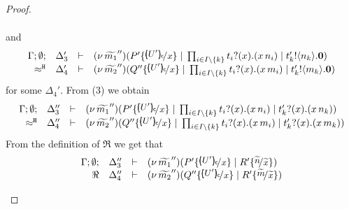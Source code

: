 \begin{proof}
\begin{enumerate}
\begin{enumerate}[i.]
\begin{eqnarray*}
							\end{eqnarray*}
							and
							\begin{eqnarray}
							\mhorel{\Gamma}{\Delta_3'}{  \newsp{\widetilde{m_1}''}{P' \subst{\omapchar{U'}}{x} \Par \prod_{i \in I\backslash{\set{k}}} \binp{t_i}{x} (\appl{x}{n_i}) \Par
									\bout{t'_k}{n_k} \inact}}
							{ \hwb }
							{\Delta_4'}{}{\newsp{\widetilde{m_2}''}{Q'' \subst{\omapchar{U'}}{x} \Par \prod_{i \in I\backslash{\set{k}}} \binp{t_i}{x} (\appl{x}{m_i}) \Par \bout{t'_k}{m_k} \inact}}
							\label{lem:tr_subst_41}
							\end{eqnarray}
							for some $\Delta_4'$.
							From  (3) we obtain
							\begin{eqnarray}
								\mhorel{\Gamma}{\Delta_3''}{  \newsp{\widetilde{m_1}''}{P' \subst{\omapchar{U'}}{x} \Par \prod_{i \in I\backslash{\set{k}}} \binp{t_i}{x} (\appl{x}{n_i}) \Par
								\binp{t'_k}{x} (\appl{x}{n_k})}}
								{ \hwb }
								{\Delta_4''}{}{\newsp{\widetilde{m_2}''}{Q'' \subst{\omapchar{U'}}{x} \Par \prod_{i \in I\backslash{\set{k}}} \binp{t_i}{x} (\appl{x}{m_i}) \Par \binp{t'_k}{x} (\appl{x}{m_k})}}
								\label{lem:tr_subst_442}
							\end{eqnarray}
							From the definition of $\Re$ we get
							that
							\begin{eqnarray*}
							\mhorel{\Gamma}{\Delta_3''}{  \newsp{\widetilde{m_1}''}{P' \subst{\omapchar{U'}}{x} \Par R' \subst{\widetilde{n}}{\widetilde{x}}}}
							{ \Re }
							{\Delta_4''}{}{\newsp{\widetilde{m_2}''}{Q'' \subst{\omapchar{U'}}{x} \Par R' \subst{\widetilde{m}}{\widetilde{x}}}}

\end{eqnarray*}
\end{enumerate}
\end{enumerate}
\end{proof}
